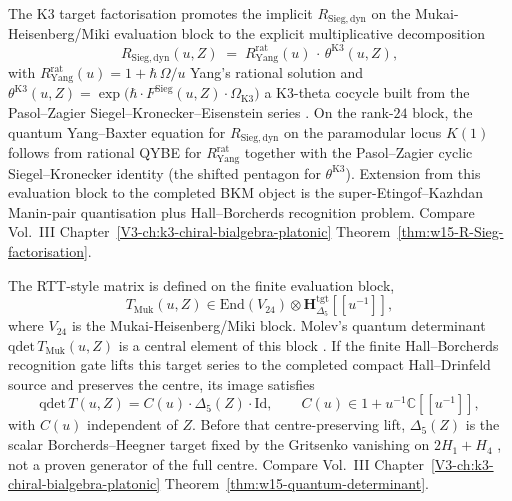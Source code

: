\begin{remark}
\label{rem:specbraid-3-supplement}
The K3 target factorisation promotes the implicit $R_{\mathrm{Sieg,dyn}}$
on the Mukai-Heisenberg/Miki evaluation block to the explicit
multiplicative decomposition
\[
 R_{\mathrm{Sieg,dyn}}(u,Z) \;=\;
 R^{\mathrm{rat}}_{\mathrm{Yang}}(u)\,\cdot\,\theta^{\mathrm{K3}}(u,Z),
\]
with $R^{\mathrm{rat}}_{\mathrm{Yang}}(u) = 1 + \hbar\,\Omega/u$
Yang's rational solution \cite{Yang1967} and
$\theta^{\mathrm{K3}}(u,Z) = \exp\bigl(\hbar\cdot
F^{\mathrm{Sieg}}(u,Z)\cdot\Omega_{\mathrm{K3}}\bigr)$ a K3-theta
cocycle built from the Pasol--Zagier Siegel--Kronecker--Eisenstein
series \cite{PasolZagier2013,ES98}. On the
rank-$24$ block, the quantum Yang--Baxter equation for
$R_{\mathrm{Sieg,dyn}}$ on the paramodular locus $K(1)$ follows from
rational QYBE for
$R^{\mathrm{rat}}_{\mathrm{Yang}}$ together with the Pasol--Zagier
cyclic Siegel--Kronecker identity (the shifted pentagon for
$\theta^{\mathrm{K3}}$). Extension from this evaluation block to the
completed BKM object is the super-Etingof--Kazhdan Manin-pair
quantisation plus Hall--Borcherds recognition problem. Compare Vol.~III
Chapter~\ref{V3-ch:k3-chiral-bialgebra-platonic}
Theorem~\ref{thm:w15-R-Sieg-factorisation}.
\end{remark}

\begin{remark}
\label{rem:specbraid-4-supplement}
The RTT-style matrix is defined on the finite evaluation block,
\[
T_{\mathrm{Muk}}(u,Z)\in\mathrm{End}(V_{24})\otimes
\mathbf H_{\Delta_5}^{\mathrm{tgt}}[[u^{-1}]],
\]
where $V_{24}$ is the Mukai-Heisenberg/Miki block. Molev's quantum
determinant $\mathrm{qdet}\,T_{\mathrm{Muk}}(u,Z)$ is a central element
of this block \cite{Mol07}. If the finite Hall--Borcherds
recognition gate lifts this target series to the completed compact
Hall--Drinfeld source and preserves the centre, its image satisfies
\[
\mathrm{qdet}\,T(u,Z)=C(u)\cdot\Delta_5(Z)\cdot\mathrm{Id},
\qquad
C(u)\in 1+u^{-1}\mathbb C[[u^{-1}]],
\]
with $C(u)$ independent of $Z$. Before that centre-preserving lift,
$\Delta_5(Z)$ is the scalar Borcherds--Heegner target fixed by the
Gritsenko vanishing on $2H_1+H_4$
\cite{Gritsenko1999,GritsenkoNikulin1998}, not a proven generator of
the full centre. Compare Vol.~III
Chapter~\ref{V3-ch:k3-chiral-bialgebra-platonic}
Theorem~\ref{thm:w15-quantum-determinant}.
\end{remark}
